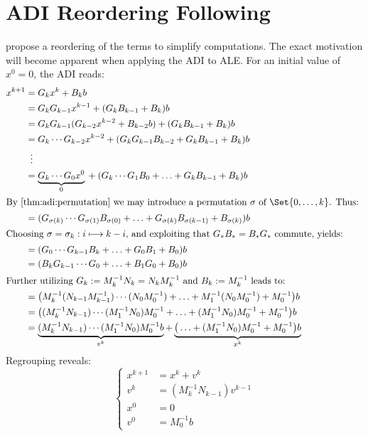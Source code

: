 \chapter{ADI Reordering Following \citeauthor{Li2002}}
\label{sec:li2002}

\citeauthor{Li2002} \cite{Li2002} propose a reordering of the terms to simplify computations.
The exact motivation will become apparent when applying the ADI to \ac{ALE}.
For an initial value of $x^0 = 0$,
the ADI reads:
\begin{align*}
  x^{k+1}
  &= G_k x^k + B_k b \\
  &= G_k G_{k-1} x^{k-1} + (G_k B_{k-1} + B_k) b \\
  &= G_k G_{k-1} (G_{k-2} x^{k-2} + B_{k-2}b) + (G_k B_{k-1} + B_k) b \\
  &= G_k \cdots G_{k-2} x^{k-2} + (G_k G_{k-1} B_{k-2} + G_k B_{k-1} + B_k) b \\
  &\vdotswithin{=} \\
  &= \underbrace{G_k \cdots G_0 x^0}_0 {} + (G_k \cdots G_1 B_0 + \ldots + G_k B_{k-1} + B_k) b \\
\intertext{%
  By \autoref{thm:adi:permutation} we may introduce a permutation $\sigma$ of $\Set{0,\ldots,k}$.
  Thus:
}
  &= (G_{\sigma(k)} \cdots G_{\sigma(1)} B_{\sigma(0)} + \ldots + G_{\sigma(k)} B_{\sigma(k-1)} + B_{\sigma(k)}) b \\
\intertext{%
  Choosing $\sigma = \sigma_k : i \mapsto k-i$,
  and exploiting that $G_* B_* = B_* G_*$ commute,
  yields:
}
  &= (G_0 \cdots G_{k-1} B_k + \ldots + G_0 B_1 + B_0) b \\
  &= (B_k G_{k-1} \cdots G_0 + \ldots + B_1 G_0 + B_0) b \\
\intertext{%
  Further utilizing $G_k := M_k^{-1} N_k = N_k M_k^{-1}$ and $B_k := M_k^{-1}$ leads to:
}
  &= \big( M_k^{-1} (N_{k-1} M_{k-1}^{-1}) \cdots (N_0 M_0^{-1}) + \ldots + M_1^{-1} (N_0 M_0^{-1}) + M_0^{-1} \big) b \\
  &= \big( (M_k^{-1} N_{k-1}) \cdots (M_1^{-1} N_0) M_0^{-1} + \ldots + (M_1^{-1} N_0) M_0^{-1} + M_0^{-1} \big) b \\
  &= \underbrace{
    (M_k^{-1} N_{k-1}) \cdots (M_1^{-1} N_0) M_0^{-1} b
  }_{v^k}
  + \underbrace{
    \big( \ldots + (M_1^{-1} N_0) M_0^{-1} + M_0^{-1} \big) b
  }_{x^k}
\end{align*}
Regrouping reveals:
\begin{equation}
\label{eq:adi:recursion}
\left\{
\begin{aligned}
  x^{k+1} &= x^k + v^k \\
  v^k &= (M_k^{-1} N_{k-1}) v^{k-1} \\
  x^0 &= 0 \\
  v^0 &= M_0^{-1} b
\end{aligned}
\right.
\end{equation}
